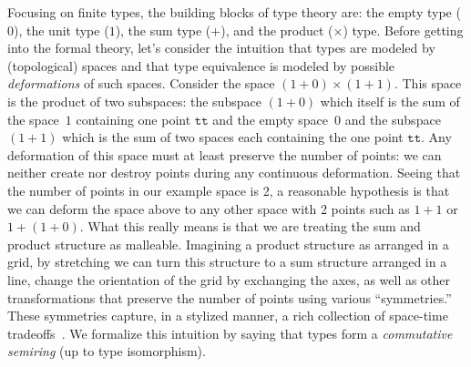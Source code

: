 \documentclass[sigplan,10pt,review,anonymous]{acmart}
\begin{document}
Focusing on finite types, the building blocks of type theory are: the
empty type ($0$), the unit type ($1$), the sum type ($+$), and the
product ($\times$) type. Before getting into the formal theory, let's
consider the intuition that types are modeled by (topological) spaces
and that type equivalence is modeled by possible \emph{deformations}
of such spaces. Consider the space $(1 + 0) \times (1 + 1)$. This
space is the product of two subspaces: the subspace $(1 + 0)$ which
itself is the sum of the space~$1$ containing one point $\texttt{tt}$
and the empty space~$0$ and the subspace $(1 + 1)$ which is the sum of
two spaces each containing the one point $\texttt{tt}$. Any
deformation of this space must at least preserve the number of points:
we can neither create nor destroy points during any continuous
deformation. Seeing that the number of points in our example space is
2, a reasonable hypothesis is that we can deform the space above to
any other space with 2 points such as $1 + 1$ or $1 + (1 + 0)$. What
this really means is that we are treating the sum and product
structure as malleable. Imagining a product structure as arranged in a
grid, by stretching we can turn this structure to a sum structure
arranged in a line, change the orientation of the grid by exchanging
the axes, as well as other transformations that preserve the number of
points using various ``symmetries.'' These symmetries capture, in a
stylized manner, a rich collection of space-time
tradeoffs~\cite{superstructural}. We formalize this intuition by
saying that types form a \emph{commutative semiring} (up to type
isomorphism).
\end{document}
